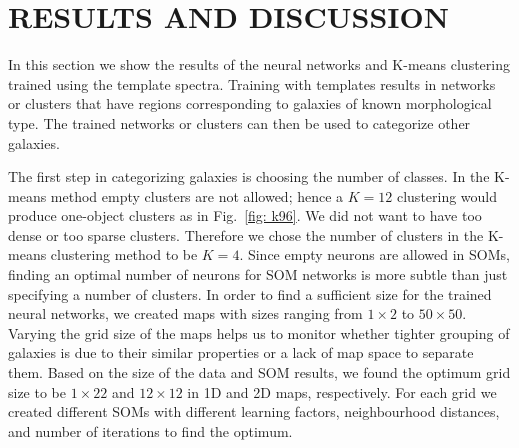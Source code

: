 

\section{RESULTS AND DISCUSSION}
\label{sec: result}

    In this section we show the results of the neural networks and K-means clustering trained using the  template spectra.
    Training with  templates results in networks or clusters that have regions corresponding to galaxies of known morphological type. 
    The trained networks or clusters can then be used to categorize other galaxies.

    The first step in categorizing galaxies is choosing the number of classes.
    In the K-means method empty clusters are not allowed; 
    hence a $K=12$ clustering would produce one-object clusters as in Fig.~\ref{fig: k96}.
    We did not want to have too dense or too sparse clusters.
    Therefore we chose the number of clusters in the K-means clustering method to be $K=4$.
    Since empty neurons are allowed in SOMs, finding an optimal number of neurons for SOM networks is more subtle than just specifying a number of clusters. 
    In order to find a sufficient size for the trained neural networks, we created maps with sizes ranging from $1\times2$ to $50\times50$.
    Varying the grid size of the maps helps us to monitor whether tighter grouping of galaxies is due to their similar properties or a lack of map space to separate them.
    Based on the size of the data and SOM results, we found the optimum grid size to be $1\times22$ and $12\times12$ in 1D and 2D maps, respectively. 
    For each grid we created different SOMs with different learning factors, neighbourhood distances, and number of iterations to find the optimum.
   
